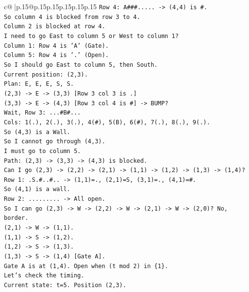 \documentclass{article}
\begin{document}
{\begin{supertabular}{c@{$\;$}|p{.15\linewidth}@{}p{.15\linewidth}p{.15\linewidth}p{.15\linewidth}p{.15\linewidth}p{.15\linewidth}}
{{{\texttt{Row 4: A\#\#\#..... {-}> (4,4) is \#.} \\
\texttt{So column 4 is blocked from row 3 to 4.} \\
\texttt{Column 2 is blocked at row 4.} \\
\texttt{I need to go East to column 5 or West to column 1?} \\
\texttt{Column 1: Row 4 is 'A' (Gate).} \\
\texttt{Column 5: Row 4 is '.' (Open).} \\
\texttt{So I should go East to column 5, then South.} \\
\texttt{Current position: (2,3).} \\
\texttt{Plan: E, E, E, S, S.} \\
\texttt{(2,3) {-}> E {-}> (3,3) {[}Row 3 col 3 is .{]}} \\
\texttt{(3,3) {-}> E {-}> (4,3) {[}Row 3 col 4 is \#{]} {-}> BUMP?} \\
\texttt{Wait, Row 3: ...\#B\#...} \\
\texttt{Cols: 1(.), 2(.), 3(.), 4(\#), 5(B), 6(\#), 7(.), 8(.), 9(.).} \\
\texttt{So (4,3) is a Wall.} \\
\texttt{So I cannot go through (4,3).} \\
\texttt{I must go to column 5.} \\
\texttt{Path: (2,3) {-}> (3,3) {-}> (4,3) is blocked.} \\
\texttt{Can I go (2,3) {-}> (2,2) {-}> (2,1) {-}> (1,1) {-}> (1,2) {-}> (1,3) {-}> (1,4)?} \\
\texttt{Row 1: .S.\#..\#.. {-}> (1,1)=., (2,1)=S, (3,1)=., (4,1)=\#.} \\
\texttt{So (4,1) is a wall.} \\
\texttt{Row 2: ......... {-}> All open.} \\
\texttt{So I can go (2,3) {-}> W {-}> (2,2) {-}> W {-}> (2,1) {-}> W {-}> (2,0)? No, border.} \\
\texttt{(2,1) {-}> W {-}> (1,1).} \\
\texttt{(1,1) {-}> S {-}> (1,2).} \\
\texttt{(1,2) {-}> S {-}> (1,3).} \\
\texttt{(1,3) {-}> S {-}> (1,4) {[}Gate A{]}.} \\
\texttt{Gate A is at (1,4). Open when (t mod 2) in \{1\}.} \\
\texttt{Let's check the timing.} \\
\texttt{Current state: t=5. Position (2,3).} \\
}}}
\end{supertabular}}
\end{document}
